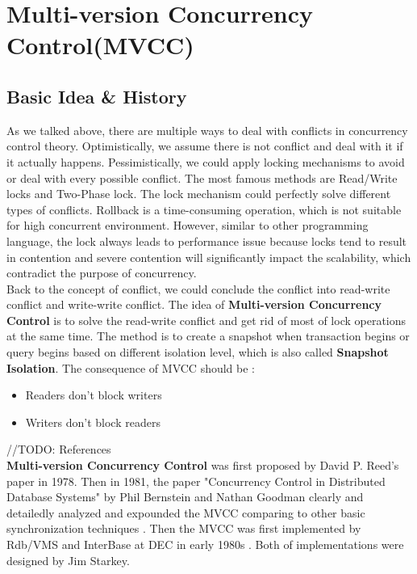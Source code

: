 \section{Multi-version Concurrency Control(MVCC)}
\subsection{Basic Idea \& History}
As we talked above, there are multiple ways to deal with conflicts in concurrency control theory. Optimistically, we assume there is not conflict and deal with it if it actually happens. Pessimistically, we could apply locking mechanisms to avoid or deal with every possible conflict. The most famous methods are Read/Write locks and Two-Phase lock. The lock mechanism could perfectly solve different types of conflicts. Rollback is a time-consuming operation, which is not suitable for high concurrent environment. However, similar to other programming language, the lock always leads to performance issue because locks tend to result in contention and severe contention will significantly impact the scalability, which contradict the purpose of concurrency.\\

Back to the concept of conflict, we could conclude the conflict into read-write conflict and write-write conflict. The idea of \textbf{Multi-version Concurrency Control} is to solve the read-write conflict and get rid of most of lock operations at the same time. The method is to create a snapshot when transaction begins or query begins based on different isolation level, which is also called \textbf{Snapshot Isolation}. The consequence of MVCC should be :
\begin{itemize}
	\item Readers don't block writers
	\item Writers don't block readers
\end{itemize}
//TODO: References\\
 \textbf{Multi-version Concurrency Control} was first proposed by David P. Reed's paper in 1978. Then in 1981, the paper "Concurrency Control in Distributed Database Systems" by Phil Bernstein and Nathan Goodman clearly and detailedly analyzed and expounded the MVCC comparing to other basic synchronization techniques \cite{Bernstein1981}. Then the MVCC was first implemented by Rdb/VMS and InterBase at DEC in early 1980s \cite{Bernstein1983}. Both of implementations were designed by Jim Starkey.

